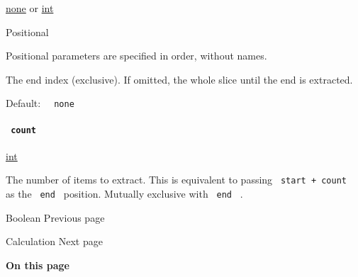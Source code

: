 \href{/docs/reference/foundations/none/}{none} {or}
\href{/docs/reference/foundations/int/}{int}

{{ Positional }}

\label{definitions-slice-end-positional-tooltip}
Positional parameters are specified in order, without names.

The end index (exclusive). If omitted, the whole slice until the end is
extracted.

Default: \texttt{\ }{\texttt{\ none\ }}\texttt{\ }

\paragraph{\texorpdfstring{\texttt{\ count\ }}{ count }}\label{definitions-slice-count}

\href{/docs/reference/foundations/int/}{int}

The number of items to extract. This is equivalent to passing
\texttt{\ start\ +\ count\ } as the \texttt{\ end\ } position. Mutually
exclusive with \texttt{\ end\ } .

\href{/docs/reference/foundations/bool/}{\pandocbounded{}}

{ Boolean } { Previous page }

\href{/docs/reference/foundations/calc/}{\pandocbounded{}}

{ Calculation } { Next page }

\textbf{On this page}

